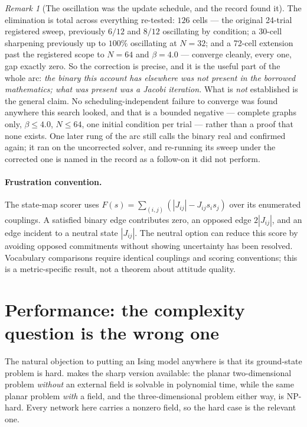 \documentclass[11pt,a4paper]{article}
\theoremstyle{remark}
\newtheorem{remark}[definition]{Remark}
\begin{document}
\begin{remark}[The oscillation was the update schedule, and the record found it]
The elimination is total across everything re-tested: $126$ cells --- the original 24-trial registered
sweep, previously $6/12$ and $8/12$ oscillating by condition; a 30-cell sharpening previously up to
$100\%$ oscillating at $N=32$; and a 72-cell extension past the registered scope to $N=64$ and
$\beta=4.0$ --- converge cleanly, every one, gap exactly zero. So the correction is precise, and it is
the useful part of the whole arc: \emph{the binary this account has elsewhere was not present in the
borrowed mathematics; what was present was a Jacobi iteration.} What is \emph{not} established is the
general claim. No scheduling-independent failure to converge was found anywhere this search looked,
and that is a bounded negative --- complete graphs only, $\beta \le 4.0$, $N \le 64$, one initial
condition per trial --- rather than a proof that none exists. One later rung of the arc still calls
the binary real and confirmed again; it ran on the uncorrected solver, and re-running its sweep under
the corrected one is named in the record as a follow-on it did not perform.
\end{remark}

\paragraph{Frustration convention.}
The state-map scorer uses
$F(s)=\sum_{(i,j)}(|J_{ij}|-J_{ij}s_i s_j)$ over its enumerated couplings.
A satisfied binary edge contributes zero, an opposed edge $2|J_{ij}|$,
and an edge incident to a neutral state $|J_{ij}|$. The neutral option can
reduce this score by avoiding opposed commitments without showing uncertainty
has been resolved. Vocabulary comparisons require identical couplings and
scoring conventions; this is a metric-specific result, not a theorem about
attitude quality.

\section{Performance: the complexity question is the wrong one}\label{sec:performance}
The natural objection to putting an Ising model anywhere is that its ground-state problem is hard.
\citet{barahona1982} makes the sharp version available: the planar two-dimensional problem
\emph{without} an external field is solvable in polynomial time, while the same planar problem
\emph{with} a field, and the three-dimensional problem either way, is NP-hard. Every network here
carries a nonzero field, so the hard case is the relevant one.
\end{document}
